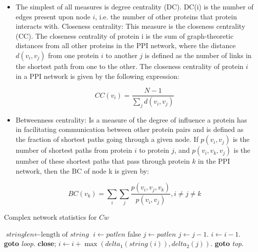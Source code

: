 \documentclass{svproc}
\begin{document}
\begin{itemize}
\item The simplest of all measures is degree centrality (DC).  DC(i) is the number of edges present upon node $i$, i.e. the number of other proteins that protein interacts with.  Closeness centrality:
This measure is the closeness centrality (CC). The closeness centrality of protein i is the sum of
graph-theoretic distances from all other proteins in the PPI network, where the distance $d(v_i, v_j)$ from one protein $i$ to another $j$ is defined as the number of links in the shortest path from one to the other. The closeness centrality of protein $i$ in a PPI network is given by the following expression:

\begin{equation}\label{closeness}
     CC(v_i) =  \frac{N - 1}{\sum_{j} d(v_i,v_j)}
\end{equation}

\item Betweenness centrality:  Is a measure of the degree of influence a protein has in facilitating communication between other protein pairs and is defined as the fraction of shortest paths going through a given node. If $p(v_i, v_j)$ is the number of shortest paths from protein $i$ to protein $j$, and $p(v_i, v_k, v_j)$ is the number of these shortest paths that pass through protein $k$ in the PPI network, then the BC of node k is given by: 

\begin{equation}\label{betweenness}
     BC (v_k) =  \sum_{i} \sum_{j} \frac{p(v_i,v_j,v_k)}{p(v_i,v_j)}, i \neq j \neq k
\end{equation}
\end{itemize}

\begin{algorithm}
\caption{Complex network statistics for $Cw$}\label{alg2}
\begin{algorithmic}[1]
\State $\textit{stringlen} \gets \text{length of }\textit{string}$
\State $i \gets \textit{patlen}$
 \Return false
\EndIf
\State $j \gets \textit{patlen}$
\State $j \gets j-1$.
\State $i \gets i-1$.
\State \textbf{goto} \emph{loop}.
\State \textbf{close};
\EndIf
\State $i \gets i+\max(\textit{delta}_1(\textit{string}(i)),\textit{delta}_2(j))$.
\State \textbf{goto} \emph{top}.
\EndProcedure
\end{algorithmic}
\end{algorithm}
\end{document}
